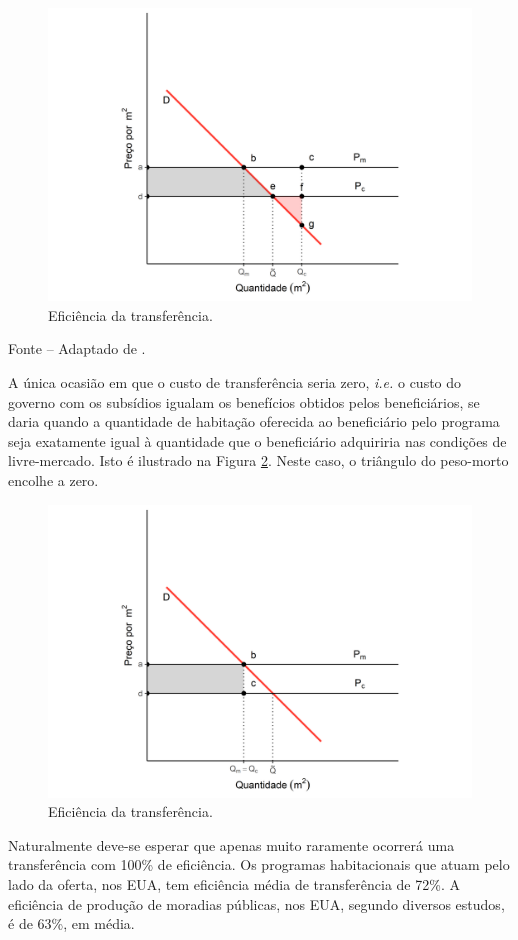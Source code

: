 \documentclass[
	12pt,				%
	oneside,			%
	a4paper,			%
	chapter=TITLE,		%
	section=TITLE,		%
	english,			%
	brazil				%
	]{abntex2}
\newcommand{\bcenter}{\begin{center}}
\newcommand{\ecenter}{\end{center}}
\begin{document}
\begin{refsection}
\begin{figure}[H]
{\centering \includegraphics[width=0.7\linewidth]{images/eficiencia2-1} 

}

\caption{Eficiência da transferência.}\label{fig:eficiencia2}
\end{figure}
\bcenter

\small Fonte -- Adaptado de \textcite{malpezzi_affordable_2018_1}.
\ecenter

A única ocasião em que o custo de transferência seria zero, \emph{i.e.} o custo do
governo com os subsídios igualam os benefícios obtidos pelos beneficiários, se
daria quando a quantidade de habitação oferecida ao beneficiário pelo programa
seja exatamente igual à quantidade que o beneficiário adquiriria nas condições
de livre-mercado. Isto é ilustrado na Figura \ref{fig:eficiencia3}. Neste caso,
o triângulo do peso-morto encolhe a zero.
\begin{figure}[H]

{\centering \includegraphics[width=0.7\linewidth]{images/eficiencia3-1} 

}

\caption{Eficiência da transferência.}\label{fig:eficiencia3}
\end{figure}
Naturalmente deve-se esperar que apenas muito raramente ocorrerá uma
transferência com 100\% de eficiência. Os programas habitacionais que atuam pelo
lado da oferta, nos \gls{EUA}, tem eficiência média de transferência de 72\%. A
eficiência de produção de moradias públicas, nos \gls{EUA}, segundo diversos
estudos, é de 63\%, em média.


\end{refsection}
\end{document}
